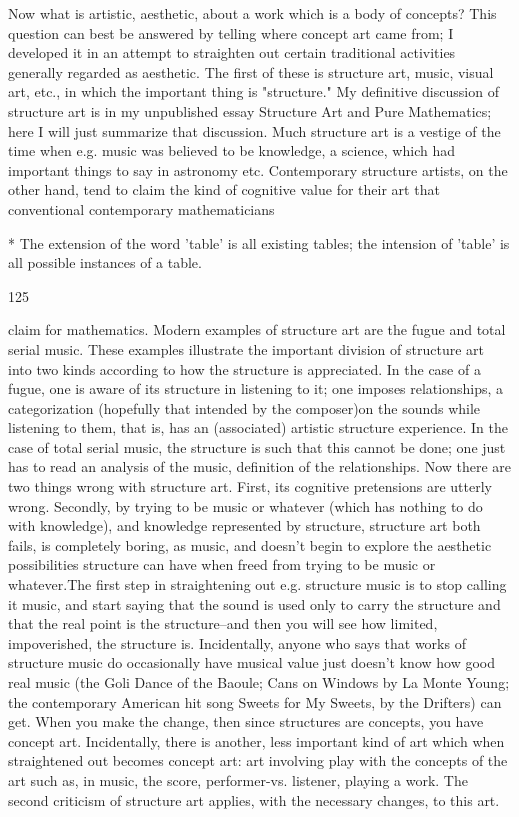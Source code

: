 \documentclass[10pt,twoside]{memoir}
\begin{document}
\begin{enumerate}
{\begin{enumerate}
\begin{sysrules}
\begin{sysrules}
\begin{sysrules}
\begin{sysrules}
{\begin{enumerate}
{{Now what is artistic, aesthetic, about a work which is a body of 
concepts? This question can best be answered by telling where concept art 
came from; I developed it in an attempt to straighten out certain traditional 
activities generally regarded as aesthetic. The first of these is structure art, 
music, visual art, etc., in which the important thing is "structure." My 
definitive discussion of structure art is in my unpublished essay Structure 
Art and Pure Mathematics; here I will just summarize that discussion. Much 
structure art is a vestige of the time when e.g. music was believed to be 
knowledge, a science, which had important things to say in astronomy etc. 
Contemporary structure artists, on the other hand, tend to claim the kind of 
cognitive value for their art that conventional contemporary mathematicians 


* The extension of the word 'table' is all existing tables; the intension of 
'table' is all possible instances of a table. 


125 


claim for mathematics. Modern examples of structure art are the fugue and 
total serial music. These examples illustrate the important division of 
structure art into two kinds according to how the structure is appreciated. In 
the case of a fugue, one is aware of its structure in listening to it; one 
imposes relationships, a categorization (hopefully that intended by the 
composer)on the sounds while listening to them, that is, has an (associated) 
artistic structure experience. In the case of total serial music, the structure is 
such that this cannot be done; one just has to read an analysis of the 
music, definition of the relationships. Now there are two things wrong with 
structure art. First, its cognitive pretensions are utterly wrong. Secondly, by 
trying to be music or whatever (which has nothing to do with knowledge), 
and knowledge represented by structure, structure art both fails, is 
completely boring, as music, and doesn't begin to explore the aesthetic 
possibilities structure can have when freed from trying to be music or 
whatever.The first step in straightening out e.g. structure music is to stop 
calling it music, and start saying that the sound is used only to carry the 
structure and that the real point is the structure--and then you will see how 
limited, impoverished, the structure is. Incidentally, anyone who says that 
works of structure music do occasionally have musical value just doesn't 
know how good real music (the Goli Dance of the Baoule; Cans on Windows 
by La Monte Young; the contemporary American hit song Sweets for My 
Sweets, by the Drifters) can get. When you make the change, then since 
structures are concepts, you have concept art. Incidentally, there is another, 
less important kind of art which when straightened out becomes concept art: 
art involving play with the concepts of the art such as, in music, the score, 
performer-vs. listener, playing a work. The second criticism of structure art 
applies, with the necessary changes, to this art. 

}}
\end{enumerate}}
\end{sysrules}
\end{sysrules}
\end{sysrules}
\end{sysrules}
\end{enumerate}}
\end{enumerate}
\end{document}
